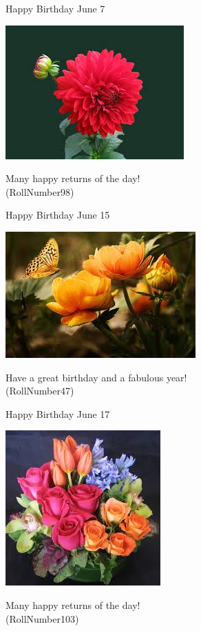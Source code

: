 \documentclass[table, landscape]{beamer}
\begin{document}
\begin{frame}{\color{red}Happy Birthday }
{June 7}
\begin{center}
\includegraphics[height=0.5\textheight]{flowers/f1.jpeg}

Many happy returns of the day! \\ \vspace{0.5cm}{\Large name91} (RollNumber98)
\end{center}
\end{frame}
\begin{frame}{\color{blue}Happy Birthday }
{June 15}
\begin{center}
\includegraphics[height=0.5\textheight]{flowers/f7.jpeg}

Have a great birthday and a fabulous year! \\ \vspace{0.5cm}{\Large name40} (RollNumber47)
\end{center}
\end{frame}
\begin{frame}{\color{red}Happy Birthday }
{June 17}
\begin{center}
\includegraphics[height=0.5\textheight]{flowers/f9.jpeg}

Many happy returns of the day! \\ \vspace{0.5cm}{\Large name96} (RollNumber103)
\end{center}
\end{frame}
\end{document}
